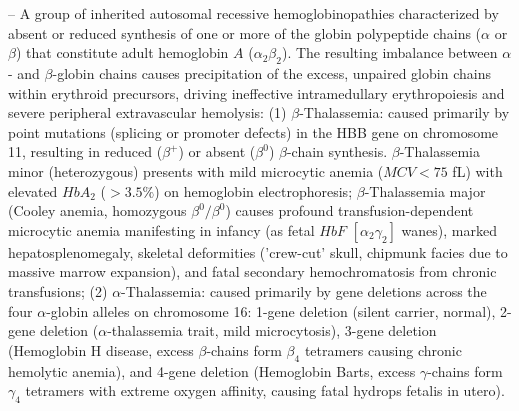 -- A group of inherited autosomal recessive hemoglobinopathies characterized by absent or reduced synthesis of one or more of the globin polypeptide chains ($\alpha$ or $\beta$) that constitute adult hemoglobin $A$ ($\alpha_2\beta_2$). The resulting imbalance between $\alpha$- and $\beta$-globin chains causes precipitation of the excess, unpaired globin chains within erythroid precursors, driving ineffective intramedullary erythropoiesis and severe peripheral extravascular hemolysis: (1) $\beta$-Thalassemia: caused primarily by point mutations (splicing or promoter defects) in the HBB gene on chromosome 11, resulting in reduced ($\beta^+$) or absent ($\beta^0$) $\beta$-chain synthesis. $\beta$-Thalassemia minor (heterozygous) presents with mild microcytic anemia ($MCV < 75$ fL) with elevated $HbA_2$ ($>3.5\%$) on hemoglobin electrophoresis; $\beta$-Thalassemia major (Cooley anemia, homozygous $\beta^0/\beta^0$) causes profound transfusion-dependent microcytic anemia manifesting in infancy (as fetal $HbF$ $[\alpha_2\gamma_2]$ wanes), marked hepatosplenomegaly, skeletal deformities ('crew-cut' skull, chipmunk facies due to massive marrow expansion), and fatal secondary hemochromatosis from chronic transfusions; (2) $\alpha$-Thalassemia: caused primarily by gene deletions across the four $\alpha$-globin alleles on chromosome 16: 1-gene deletion (silent carrier, normal), 2-gene deletion ($\alpha$-thalassemia trait, mild microcytosis), 3-gene deletion (Hemoglobin H disease, excess $\beta$-chains form $\beta_4$ tetramers causing chronic hemolytic anemia), and 4-gene deletion (Hemoglobin Barts, excess $\gamma$-chains form $\gamma_4$ tetramers with extreme oxygen affinity, causing fatal hydrops fetalis in utero).

